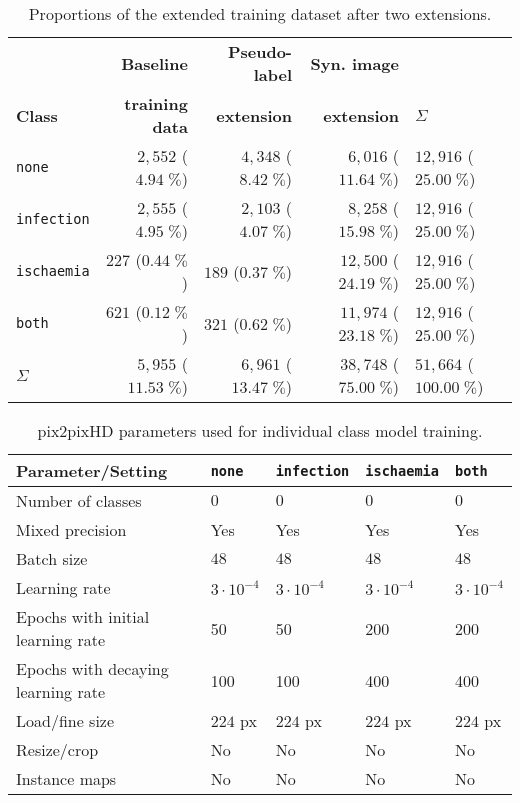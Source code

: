 \documentclass[runningheads]{llncs}
\begin{document}
\begin{table}[ht!]
	\begin{center}
	\caption{Proportions of the extended training dataset after two extensions.}
		\label{tab:pseudolabels_synthetic}
			\begin{tabularx}{\textwidth}{|X|r|r|r||l|}
			\hline
			\textbf{}& \textbf{Baseline}&\textbf{Pseudo-label} & \textbf{Syn. image}&\\
			\textbf{Class} & \textbf{training data} & \textbf{extension} & \textbf{extension} & \textbf{$\Sigma$} \\
			\hline
			\hline	
			\texttt{none} & $2,552$ ($4.94 \;\%$) & $4,348$ ($8.42 \;\%$) & $6,016$ ($11.64 \;\%$) & $12,916$ ($25.00 \;\%$) \\
			\texttt{infection} & $2,555$ ($4.95 \;\%$) & $2,103$ ($4.07 \;\%$) & $8,258$ ($15.98 \;\%$) & $12,916$ ($25.00 \;\%$) \\
			\texttt{ischaemia} & 227 ($0.44 \;\%$) & $189$ ($0.37 \;\%$) & $12,500$ ($24.19 \;\%$) & $12,916$ ($25.00 \;\%$) \\
			\texttt{both} & $621$ ($0.12 \;\%$) & $321$ ($0.62 \;\%$) & $11,974$ ($23.18 \;\%$) & $12,916$ ($25.00 \;\%$) \\
			\hline
			\hline
			$\Sigma$ & $5,955$ ($11.53 \;\%$) & $6,961$ ($13.47 \;\%$) & $38,748$ ($75.00 \;\%$) & $51,664$ ($100.00 \;\%$) \\
			\hline
		\end{tabularx}
	\end{center}
\end{table}

\begin{table}[ht!]
	\begin{center}
		\caption{pix2pixHD parameters used for individual class model training.}
		\label{tab:p2phdtrain}
			\begin{tabularx}{\textwidth}{|l|X|X|X|X|}
			\hline
			\textbf{Parameter/Setting} & \texttt{none} & \texttt{infection} & \texttt{ischaemia} & \texttt{both} \\
			\hline
			\hline
			Number of classes & $0$ & $0$ & $0$ & $0$ \\
			Mixed precision & Yes & Yes & Yes & Yes \\
			Batch size & $48$ & $48$ & $48$ & $48$ \\
			Learning rate & $3\cdot 10^{-4}$ & $3\cdot 10^{-4}$ & $3\cdot 10^{-4}$ & $3\cdot 10^{-4}$ \\
			Epochs with initial learning rate & 50 & 50 & 200 & 200 \\
			Epochs with decaying learning rate & 100 & 100 & 400 & 400 \\
			Load/fine size & $224$ px & $224$ px & $224$ px & $224$ px \\
			Resize/crop & No & No & No & No \\
			Instance maps & No & No & No & No \\
			\hline
		\end{tabularx}
	\end{center}
\end{table}
\end{document}
